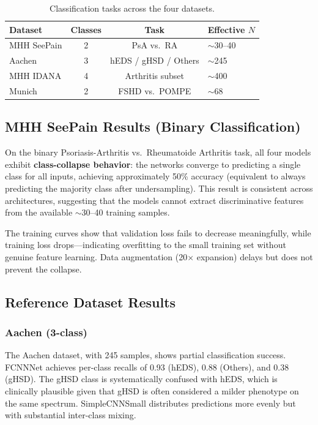 \documentclass[conference]{IEEEtran}
\begin{document}
\begin{table}[t]
\centering
\caption{Classification tasks across the four datasets.}
\label{tab:tasks}
\begin{tabular}{@{}lccl@{}}
\toprule
\textbf{Dataset} & \textbf{Classes} & \textbf{Task} & \textbf{Effective $N$} \\
\midrule
MHH SeePain & 2 & PsA vs.\ RA & $\sim$30--40 \\
Aachen & 3 & hEDS / gHSD / Others & $\sim$245 \\
MHH IDANA & 4 & Arthritis subset & $\sim$400 \\
Munich & 2 & FSHD vs.\ POMPE & $\sim$68 \\
\bottomrule
\end{tabular}
\end{table}

\subsection{MHH SeePain Results (Binary Classification)}

On the binary Psoriasis-Arthritis vs.\ Rheumatoide Arthritis task, all four models exhibit \textbf{class-collapse behavior}: the networks converge to predicting a single class for all inputs, achieving approximately 50\% accuracy (equivalent to always predicting the majority class after undersampling). This result is consistent across architectures, suggesting that the models cannot extract discriminative features from the available $\sim$30--40 training samples.

The training curves show that validation loss fails to decrease meaningfully, while training loss drops—indicating overfitting to the small training set without genuine feature learning. Data augmentation (20$\times$ expansion) delays but does not prevent the collapse.

\subsection{Reference Dataset Results}

\subsubsection{Aachen (3-class)}
The Aachen dataset, with 245 samples, shows partial classification success. FCNNNet achieves per-class recalls of 0.93 (hEDS), 0.88 (Others), and 0.38 (gHSD). The gHSD class is systematically confused with hEDS, which is clinically plausible given that gHSD is often considered a milder phenotype on the same spectrum. SimpleCNNSmall distributes predictions more evenly but with substantial inter-class mixing.
\end{document}
